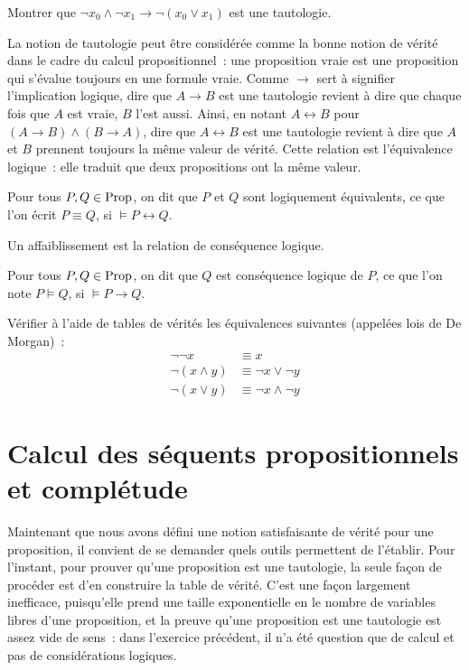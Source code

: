 \begin{exercise}
  Montrer que $\lnot x_0\land \lnot x_1 \to \lnot (x_0\lor x_1)$ est une
  tautologie.
\end{exercise}

La notion de tautologie peut être considérée comme la bonne notion de vérité
dans le cadre du calcul propositionnel~: une proposition vraie est une
proposition qui s'évalue toujours en une formule vraie. Comme $\to$ sert à
signifier l'implication logique, dire que $A \to B$ est une tautologie revient à
dire que chaque fois que $A$ est vraie, $B$ l'est aussi. Ainsi, en notant
$A \leftrightarrow B$ pour $(A \to B) \land (B \to A)$, dire que
$A \leftrightarrow B$ est une tautologie revient à dire que $A$ et $B$ prennent
toujours la même valeur de vérité. Cette relation est l'équivalence logique~:
elle traduit que deux propositions ont la même valeur.

\begin{definition}
  Pour tous $P,Q\in\operatorname{Prop}$, on dit que $P$ et $Q$ sont logiquement équivalents,
  ce que l'on écrit $P\equiv Q$, si $\models P \leftrightarrow Q$.
\end{definition}

Un affaiblissement est la relation de conséquence logique.

\begin{definition}
  Pour tous $P,Q\in\operatorname{Prop}$, on dit que $Q$ est conséquence logique de $P$, ce que
  l'on note $P\vDash Q$, si $\models P\to Q$.
\end{definition}

\begin{exercise}
  Vérifier à l'aide de tables de vérités les équivalences suivantes (appelées
  lois de De Morgan)~:
  \begin{align*}
    \lnot\lnot x &\equiv x\\
    \lnot (x \land y) &\equiv \lnot x \lor \lnot y\\
    \lnot (x \lor y) &\equiv \lnot x \land \lnot y
  \end{align*}
\end{exercise}

\section[Séquents propositionnels]{Calcul des séquents propositionnels et
  complétude}

Maintenant que nous avons défini une notion satisfaisante de vérité pour une
proposition, il convient de se demander quels outils permettent de l'établir.
Pour l'instant, pour prouver qu'une proposition est une tautologie, la seule
façon de procéder est d'en construire la table de vérité. C'est une façon
largement inefficace, puisqu'elle prend une taille exponentielle en le nombre de
variables libres d'une proposition, et la preuve qu'une proposition est une
tautologie est assez vide de sens~: dans l'exercice précédent, il n'a été
question que de calcul et pas de considérations logiques.

